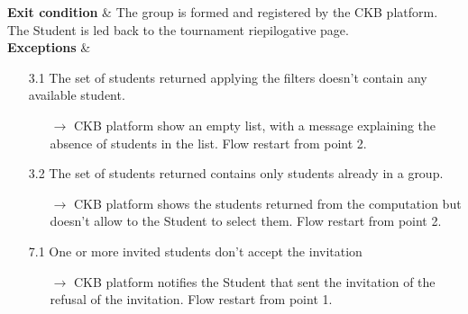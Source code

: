 \documentclass{article}
\begin{document}
{\begin{enumerate}
\begin{xltabular}{\textwidth}
              \hline
              \textbf{Exit condition} & The group is formed and registered by the
              CKB platform. The Student is led back to the tournament riepilogative page.\\
              \hline
              \textbf{Exceptions} &    \begin{itemize}
                  \item[3.1] The set of students returned applying the filters
                        doesn't contain any available student.
                        \begin{itemize}
                            \item[$\rightarrow$] CKB platform show an empty list, with
                                  a message explaining the absence of students in the list. Flow restart from point 2.
                        \end{itemize}
                  \item[3.2] The set of students returned contains only students
                        already in a group.
                        \begin{itemize}
                            \item[$\rightarrow$] CKB platform shows the students returned
                                  from the computation but doesn't allow to the Student to select them.
                                  Flow restart from point 2.
                        \end{itemize}
                  \item[7.1] One or more invited students don't accept the invitation
                        \begin{itemize}
                            \item[$\rightarrow$] CKB platform notifies the Student that sent the invitation
                                  of the refusal of the invitation. Flow restart from point 1.
                        \end{itemize}
              \end{itemize}
          \end{xltabular}


\end{enumerate}}
\end{document}
